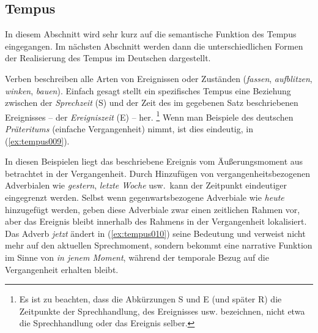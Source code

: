 \subsection{Tempus}
\label{sec:tempus}

In diesem Abschnitt wird sehr kurz auf die semantische Funktion des Tempus eingegangen.
Im nächsten Abschnitt werden dann die unterschiedlichen Formen der Realisierung des Tempus im Deutschen dargestellt.

Verben beschreiben alle Arten von Ereignissen oder Zuständen (\textit{fassen}, \textit{aufblitzen}, \textit{winken}, \textit{bauen}).
Einfach gesagt stellt ein spezifisches Tempus eine Beziehung zwischen der \textit{Sprechzeit} (S) und der Zeit des im gegebenen Satz beschriebenen Ereignisses -- der \textit{Ereigniszeit} (E) -- her.%
\footnote{Es ist zu beachten, dass die Abkürzungen S und E (und später R) die Zeitpunkte der Sprechhandlung, des Ereignisses usw. bezeichnen, nicht etwa die Sprechhandlung oder das Ereignis selber.}
Wenn man Beispiele des deutschen \textit{Präteritums} (einfache Vergangenheit) nimmt, ist dies eindeutig, \zB in (\ref{ex:tempus009}).

\begin{exe}
  \ex\label{ex:tempus009}
  \begin{xlist}
  \end{xlist}
\end{exe}

In diesen Beispielen liegt das beschriebene Ereignis vom Äußerungsmoment aus betrachtet in der Vergangenheit.
Durch Hinzufügen von vergangenheitsbezogenen Adverbialen wie \textit{gestern}, \textit{letzte Woche} usw.\ kann der Zeitpunkt eindeutiger eingegrenzt werden.
Selbst wenn gegenwartsbezogene Adverbiale wie \textit{heute} hinzugefügt werden, geben diese Adverbiale zwar einen zeitlichen Rahmen vor, aber das Ereignis bleibt innerhalb des Rahmens in der Vergangenheit lokalisiert.
Das Adverb \textit{jetzt} ändert in (\ref{ex:tempus010}) seine Bedeutung und verweist nicht mehr auf den aktuellen Sprechmoment, sondern bekommt eine narrative Funktion im Sinne von \textit{in jenem Moment}, während der temporale Bezug auf die Vergangenheit erhalten bleibt.

\begin{exe}
  \ex\begin{xlist}
  \end{xlist}
\end{exe}

